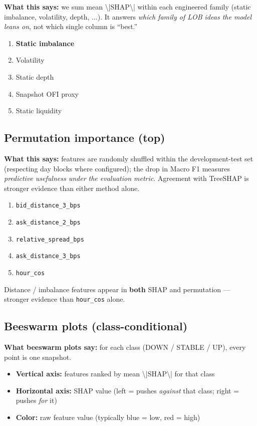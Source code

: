 \documentclass[11pt,a4paper]{article}
\begin{document}
\textbf{What this says:} we sum mean \textbackslash{}|SHAP\textbackslash{}| within each engineered family (static imbalance, volatility, depth, ...). It answers \textit{which family of LOB ideas the model leans on}, not which single column is ``best.''


\begin{enumerate}
\item \textbf{Static imbalance}  
\item Volatility  
\item Static depth  
\item Snapshot OFI proxy  
\item Static liquidity  
\end{enumerate}

\subsection{Permutation importance (top)}

\textbf{What this says:} features are randomly shuffled within the development-test set (respecting day blocks where configured); the drop in Macro F1 measures \textit{predictive usefulness under the evaluation metric}. Agreement with TreeSHAP is stronger evidence than either method alone.


\begin{enumerate}
\item \texttt{bid\_distance\_3\_bps}  
\item \texttt{ask\_distance\_2\_bps}  
\item \texttt{relative\_spread\_bps}  
\item \texttt{ask\_distance\_3\_bps}  
\item \texttt{hour\_cos}  
\end{enumerate}

Distance / imbalance features appear in \textbf{both} SHAP and permutation --- stronger evidence than \texttt{hour\_cos} alone.


\subsection{Beeswarm plots (class-conditional)}

\textbf{What beeswarm plots say:} for each class (DOWN / STABLE / UP), every point is one snapshot.

\begin{itemize}
\item \textbf{Vertical axis:} features ranked by mean \textbackslash{}|SHAP\textbackslash{}| for that class  
\item \textbf{Horizontal axis:} SHAP value (left = pushes \textit{against} that class; right = pushes \textit{for} it)  
\item \textbf{Color:} raw feature value (typically blue = low, red = high)
\end{itemize}
\end{document}
